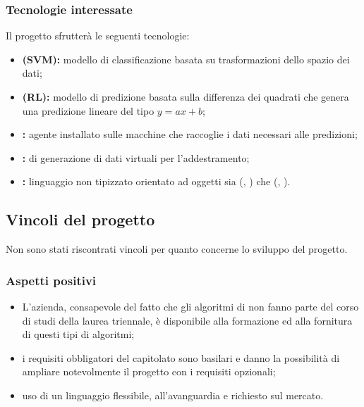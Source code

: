 		\subsubsection{Tecnologie interessate}
			Il progetto sfrutterà le seguenti tecnologie:
			\begin{itemize}
			  \item \textbf{ (SVM):} modello di classificazione basata su trasformazioni dello spazio dei dati;
			  \item \textbf{ (RL):} modello di predizione basata sulla differenza dei quadrati che genera una predizione lineare del tipo \(y=ax+b\);
				\item \textbf{:} agente installato sulle macchine che raccoglie i dati necessari alle predizioni;
				\item \textbf{:}  di generazione di dati virtuali per l'addestramento;
			  \item \textbf{:} linguaggio non tipizzato orientato ad oggetti sia  (, ) che  (, ).
			\end{itemize}

		\subsection{Vincoli del progetto}
			Non sono stati riscontrati vincoli per quanto concerne lo sviluppo del progetto.

		\subsubsection{Aspetti positivi}
			\begin{itemize}
			  \item L’azienda, consapevole del fatto che gli algoritmi di  non fanno parte del corso di studi della laurea triennale, è disponibile alla formazione ed alla fornitura di questi tipi di algoritmi;
			  \item i requisiti obbligatori del capitolato sono basilari e danno la possibilità di ampliare notevolmente il progetto con i requisiti opzionali;
			  \item uso di un linguaggio flessibile, all'avanguardia e richiesto sul mercato.
			\end{itemize}

